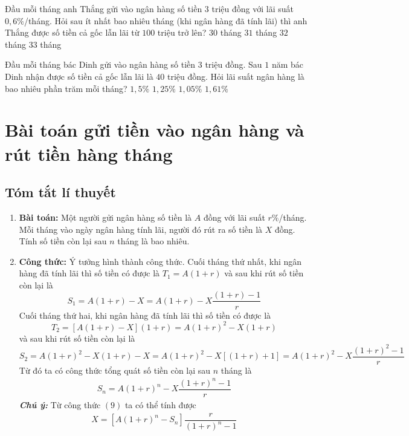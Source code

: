 \begin{vd}%
	Đầu mỗi tháng anh Thắng gửi vào ngân hàng số tiền $3$ triệu đồng với lãi suất $0,6\%$/tháng. Hỏi sau ít nhất bao nhiêu tháng (khi ngân hàng đã tính lãi) thì anh Thắng được số tiền cả gốc lẫn lãi từ $100$ triệu trở lên?\newline
	\choice
	{$30$ tháng}
	{\True $31$ tháng}
	{$32$ tháng}
	{$33$ tháng}
\end{vd}

\begin{vd}%
	Đầu mỗi tháng bác Dinh gửi vào ngân hàng số tiền $3$ triệu đồng.  Sau $1$ năm bác Dinh nhận được số tiền cả gốc lẫn lãi là $40$ triệu đồng. Hỏi lãi suất ngân hàng là bao nhiêu phần trăm mỗi tháng?\newline
	\choice
	{$1,5\%$}
	{$1,25\%$}
	{$1,05\%$}
	{\True $1,61\%$}
\end{vd}

\section{Bài toán gửi tiền vào ngân hàng và rút tiền hàng tháng}
\subsection{Tóm tắt lí thuyết}
\begin{enumerate}[1)]
	\item \textbf{Bài toán:} Một người gửi ngân hàng số tiền là $A$ đồng với lãi suất $r\%$/tháng. Mỗi tháng vào ngày ngân hàng tính lãi, người đó rút ra số tiền là $X$ đồng. Tính số tiền còn lại sau $n$ tháng là bao nhiêu.
	\item \textbf{Công thức:} Ý tưởng hình thành công thức. Cuối tháng thứ nhất, khi ngân hàng đã tính lãi thì số tiền có được là $T_1=A(1+r)$ và sau khi rút số tiền còn lại là 
	$$S_1=A(1+r)-X=A(1+r)-X\dfrac{(1+r)-1}{r}$$
	Cuối tháng thứ hai, khi ngân hàng đã tính lãi thì số tiền có được là
	$$T_2=\left[A(1+r)-X\right](1+r)=A(1+r)^2-X(1+r)$$
	và sau khi rút số tiền còn lại là
	$$S_2=A(1+r)^2-X(1+r)-X=A(1+r)^2-X\left[(1+r)+1\right]=A(1+r)^2-X\dfrac{(1+r)^2-1}{r}$$
	Từ đó ta có công thức tổng quát số tiền còn lại sau $n$ tháng là
	\begin{eqnarray}
	\boxed{S_n=A(1+r)^n-X\dfrac{(1+r)^n-1}{r}}
	\end{eqnarray}
	\textit{\textbf{Chú ý:}} Từ công thức $(9)$ ta có thể tính được
	\begin{eqnarray}
	\boxed{X=\left[A(1+r)^n-S_n\right]\dfrac{r}{(1+r)^n-1}}
	\end{eqnarray}
\end{enumerate}
